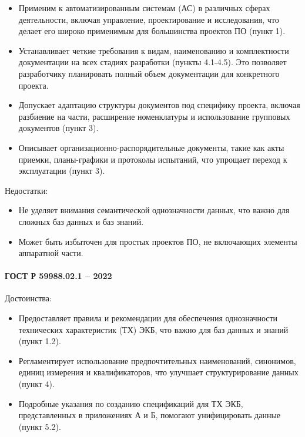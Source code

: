 \begin{itemize}
	\item Применим к автоматизированным системам (АС)
		в различных сферах деятельности, включая управление,
		проектирование и исследования,
		что делает его широко применимым для большинства проектов ПО (пункт 1).
	\item Устанавливает четкие требования к видам,
		наименованию и комплектности документации
		на всех стадиях разработки (пункты 4.1-4.5).
		Это позволяет разработчику планировать полный объем документации
		для конкретного проекта.
	\item Допускает адаптацию структуры документов под специфику проекта,
		включая разбиение на части, расширение номенклатуры
		и использование групповых документов (пункт 3).
	\item Описывает организационно-распорядительные документы,
		такие как акты приемки, планы-графики и протоколы испытаний,
		что упрощает переход к эксплуатации (пункт 3).
\end{itemize}

Недостатки:

\begin{itemize}
	\item Не уделяет внимания семантической однозначности данных,
		что важно для сложных баз данных и баз знаний.
	\item Может быть избыточен для простых проектов ПО,
		не включающих элементы аппаратной части.
\end{itemize}

\paragraph{ГОСТ Р 59988.02.1 -- 2022}

Достоинства:

\begin{itemize}
	\item Предоставляет правила
		и рекомендации для обеспечения однозначности
		технических характеристик (ТХ) ЭКБ,
		что важно для баз данных и знаний (пункт 1.2).
	\item Регламентирует использование предпочтительных наименований,
		синонимов, единиц измерения и квалификаторов,
		что улучшает структурирование данных (пункт 4).
	\item Подробные указания по созданию спецификаций для ТХ ЭКБ,
		представленных в приложениях А и Б,
		помогают унифицировать данные (пункт 5.2).
\end{itemize}


